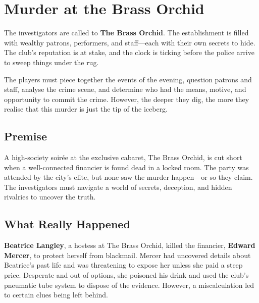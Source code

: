 \section{Murder at the Brass Orchid}

The investigators are called to \textbf{The Brass Orchid}. The establishment is filled with wealthy patrons, performers, and staff—each with their own secrets to hide. The club’s reputation is at stake, and the clock is ticking before the police arrive to sweep things under the rug.

The players must piece together the events of the evening, question patrons and staff, analyse the crime scene, and determine who had the means, motive, and opportunity to commit the crime. However, the deeper they dig, the more they realise that this murder is just the tip of the iceberg.

\subsection{Premise} 
A high-society soirée at the exclusive cabaret, The Brass Orchid, is cut short when a well-connected financier is found dead in a locked room. The party was attended by the city's elite, but none saw the murder happen—or so they claim. The investigators must navigate a world of secrets, deception, and hidden rivalries to uncover the truth.

\subsection{What Really Happened} 
\textbf{Beatrice Langley}, a hostess at The Brass Orchid, killed the financier, \textbf{Edward Mercer}, to protect herself from blackmail. Mercer had uncovered details about Beatrice’s past life and was threatening to expose her unless she paid a steep price. Desperate and out of options, she poisoned his drink and used the club’s pneumatic tube system to dispose of the evidence. However, a miscalculation led to certain clues being left behind.


